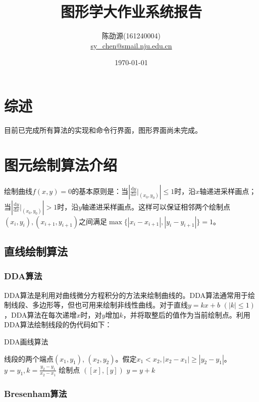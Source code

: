 \documentclass[a4paper,12pt]{article}
\title{图形学大作业系统报告}
\author{陈劭源(161240004) \\ \href{mailto:sy_chen@smail.nju.edu.cn}{sy\_chen@smail.nju.edu.cn}}
\date{\today}
\begin{document}
\maketitle

\section{综述}

目前已完成所有算法的实现和命令行界面，图形界面尚未完成。

\section{图元绘制算法介绍}
绘制曲线$f(x,y) = 0$的基本原则是：当$\left|\frac{\mathrm{d}y}{\mathrm{d}x} \big|_{(x_0, y_0)} \right| \leq 1$时，沿$x$轴递进采样画点；当$\left|\frac{\mathrm{d}y}{\mathrm{d}x} \big|_{(x_0, y_0)} \right| > 1$时，沿$y$轴递进采样画点。这样可以保证相邻两个绘制点$(x_i, y_i), (x_{i+1}, y_{i+1})$之间满足$\max\{|x_i - x_{i+1}|, |y_i - y_{i+1}|\} = 1$。

\subsection{直线绘制算法}

\subsubsection{DDA算法}

DDA算法是利用对曲线微分方程积分的方法来绘制曲线的。DDA算法通常用于绘制线段、多边形等，但也可用来绘制非线性曲线\cite{wiki:DDA}。对于直线$y = kx + b$ $(|k| \leq 1)$，DDA算法在每次递增$x$时，对$y$增加$k$，并将取整后的值作为当前绘制点。利用DDA算法绘制线段的伪代码如下：

\begin{algorithm}[htb] 
\caption{DDA画线算法} 
\label{alg:DDA} 
\begin{algorithmic}[1] 
\Require 
线段的两个端点$(x_1, y_1)$, $(x_2, y_2)$。假定$x_1 < x_2, |x_2 - x_1| \geq |y_2 - y_1|$。
\State $y = y_1, k = \frac{y_2 - y_1}{x_2 - x_1}$
    \State 绘制点 $([x], [y])$
    \State $y = y + k$
\EndFor
\end{algorithmic} 
\end{algorithm}

\subsubsection{Bresenham算法}
\end{document}
